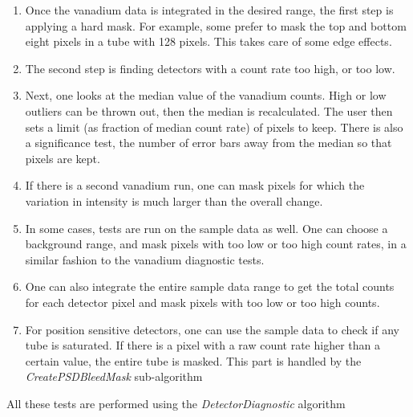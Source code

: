 \begin{enumerate}
\item Once the vanadium data is integrated in the desired range, the first step is applying a hard mask. For example, some prefer to mask the top and bottom eight pixels in a tube with 128 pixels. This takes care of some edge effects.
\item The second step is finding detectors with a count rate too high, or too low.
\item Next, one looks at the median value of the vanadium counts. High or low outliers can be thrown out, then the median is recalculated. The user then sets a limit (as fraction of median count rate) of pixels to keep. There is also a significance test, the number of error bars away from the median so that pixels are kept. 
\item If there is a second vanadium run, one can mask pixels for which the variation in intensity is much larger than the overall change.
\item In some cases, tests are run on the sample data as well. One can choose a background range, and mask pixels with too low or too high count rates, in a similar fashion to the vanadium diagnostic tests.
\item One can also integrate the entire sample data range to get the total counts for each detector pixel and mask pixels with too low or too high counts.
\item For position sensitive detectors, one can use the sample data to check if any tube is saturated. If there is a pixel with a raw count rate higher than a certain value, the entire tube is masked. This part is handled by the \textit{CreatePSDBleedMask} sub-algorithm 
\end{enumerate}

All these tests are performed using the \textit{DetectorDiagnostic} algorithm

